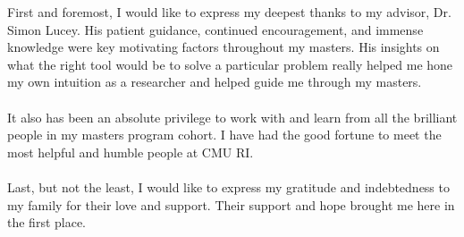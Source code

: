 First and foremost, I would like to express my deepest thanks to my advisor, Dr. Simon Lucey. His patient guidance, continued encouragement,
and immense knowledge were key motivating factors throughout my masters. His insights on what the right tool would be to solve a particular problem really helped me hone my own intuition as a researcher and helped guide me through my masters.\\\\
It also has been an absolute privilege to work with and learn from all the brilliant people in my masters program cohort. I have had the good fortune to meet the most helpful and humble people at CMU RI.\\\\
Last, but not the least, I would like to express my gratitude and indebtedness
to my family for their love and support. Their support
and hope brought me here in the first place.